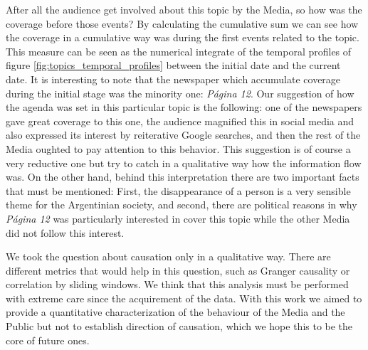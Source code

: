 After all the audience get involved about this topic by the Media, so how was the coverage before those events?
By calculating the cumulative sum we can see how the coverage in a cumulative way was during the first events related to the topic. 
This measure can be seen as the numerical integrate of the temporal profiles of figure \ref{fig:topics_temporal_profiles} between the initial date and the current date. 
It is interesting to note that the newspaper which accumulate coverage during the initial stage was the minority one: \emph{Página 12}. 
Our suggestion of how the agenda was set in this particular topic is the following: one of the newspapers gave great coverage to this one, the audience magnified this in social media and also expressed its interest by reiterative Google searches, and then the rest of the Media oughted to pay attention to this behavior. This suggestion is of course a very reductive one but try to catch in a qualitative way how the information flow was.
On the other hand, behind this interpretation there are two important facts that must be mentioned: First, the disappearance of a person is a very sensible theme for the Argentinian society, and second, there are political reasons in why \emph{Página 12} was particularly interested in cover this topic while the other Media did not follow this interest.

\par We took the question about causation only in a qualitative way. 
There are different metrics that would help in this question, such as Granger causality or correlation by sliding windows. We think that this analysis must be performed with extreme care since the acquirement of the data.
With this work we aimed to provide a quantitative characterization of the behaviour of the Media and the Public but not to establish direction of causation, which we hope this to be the core of future ones.


